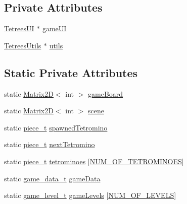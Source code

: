 \subsection*{Private Attributes}
\begin{DoxyCompactItemize}
\item 
\mbox{\hyperlink{classTetreesUI}{Tetrees\+UI}} $\ast$ \mbox{\hyperlink{classTetreesEngine_a01bf1d438236d5f57129ffb22adf59ce}{game\+UI}}
\item 
\mbox{\hyperlink{classTetreesUtils}{Tetrees\+Utils}} $\ast$ \mbox{\hyperlink{classTetreesEngine_ac4d6256982306ab8a02e18793cb803c0}{utils}}
\end{DoxyCompactItemize}
\subsection*{Static Private Attributes}
\begin{DoxyCompactItemize}
\item 
static \mbox{\hyperlink{classMatrix2D}{Matrix2D}}$<$ int $>$ \mbox{\hyperlink{classTetreesEngine_a37d082a7816d6731b2703dd6d1a1cb97}{game\+Board}}
\item 
static \mbox{\hyperlink{classMatrix2D}{Matrix2D}}$<$ int $>$ \mbox{\hyperlink{classTetreesEngine_aeade477c0bc2eaaa894ebbdaca93584e}{scene}}
\item 
static \mbox{\hyperlink{structpiece__t}{piece\+\_\+t}} \mbox{\hyperlink{classTetreesEngine_a26435ee2f02d9ba70d9e359745114f6e}{spawned\+Tetromino}}
\item 
static \mbox{\hyperlink{structpiece__t}{piece\+\_\+t}} \mbox{\hyperlink{classTetreesEngine_a44c902481f5d8a72ca8a78d24f5c3a33}{next\+Tetromino}}
\item 
static \mbox{\hyperlink{structpiece__t}{piece\+\_\+t}} \mbox{\hyperlink{classTetreesEngine_a07ae13fb62e86b45c834947243a913df}{tetrominoes}} \mbox{[}\mbox{\hyperlink{TetreesDefs_8hpp_a69fa4aa1afe74f7f9ec42bf1e07ddf28}{N\+U\+M\+\_\+\+O\+F\+\_\+\+T\+E\+T\+R\+O\+M\+I\+N\+O\+ES}}\mbox{]}
\item 
static \mbox{\hyperlink{structgame__data__t}{game\+\_\+data\+\_\+t}} \mbox{\hyperlink{classTetreesEngine_afa356b8bb38e8918400e7175d6fbbd2e}{game\+Data}}
\item 
static \mbox{\hyperlink{structgame__level__t}{game\+\_\+level\+\_\+t}} \mbox{\hyperlink{classTetreesEngine_a03ea87d7cefe7b216977c9123fc6ef60}{game\+Levels}} \mbox{[}\mbox{\hyperlink{TetreesDefs_8hpp_a350a4204247d3562e237e289533cc31f}{N\+U\+M\+\_\+\+O\+F\+\_\+\+L\+E\+V\+E\+LS}}\mbox{]}
\end{DoxyCompactItemize}


